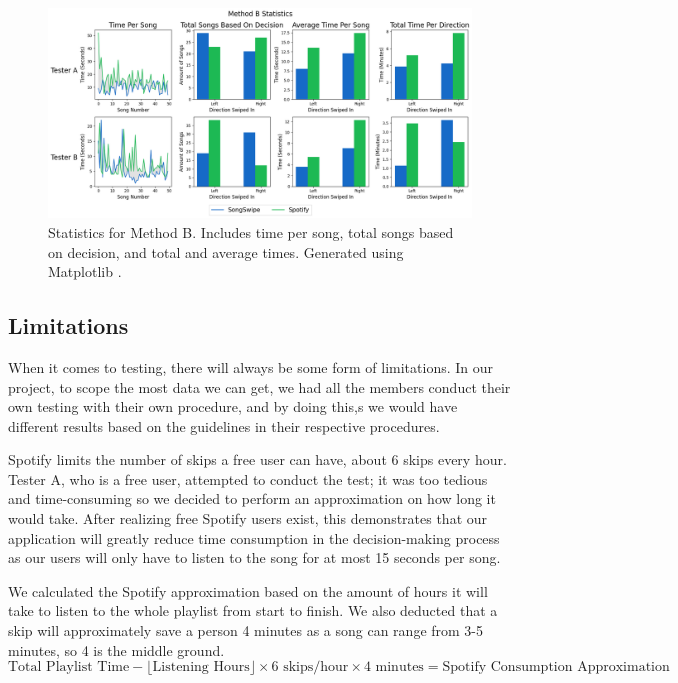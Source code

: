\documentclass{article}
\begin{document}
\begin{figure}[ht]
    \centering
    \includegraphics[width=6in]{./method_b_statistics.png}
    \caption{Statistics for Method B. Includes time per song, total songs based on decision, and total and average times. Generated using Matplotlib \cite{Matplot}.}
    \label{fig:methodbstats}
  \end{figure}

\subsection{Limitations}
When it comes to testing, there will always be some form of limitations. In our project, to scope the most data we can get, we had all the members conduct their own testing with their own procedure, and by doing this,s we would have different results based on the guidelines in their respective procedures.

Spotify limits the number of skips a free user can have, about 6 skips every hour. Tester A, who is a free user, attempted to conduct the test; it was too tedious and time-consuming so we decided to perform an approximation on how long it would take. After realizing free Spotify users exist, this demonstrates that our application will greatly reduce time consumption in the decision-making process as our users will only have to listen to the song for at most 15 seconds per song.
    
\begin{center}
    We calculated the Spotify approximation based on the amount of hours it will take to listen to the whole playlist from start to finish. We also deducted that a skip will approximately save a person 4 minutes as a song can range from 3-5 minutes, so 4 is the middle ground. \newline 
\begin{equation}
\text{Total Playlist Time} - \lfloor\text{Listening Hours}\rfloor \times 6\text{ skips/hour} \times 4\text{ minutes} = \text{Spotify Consumption Approximation}
\end{equation}
\end{center}
\end{document}

